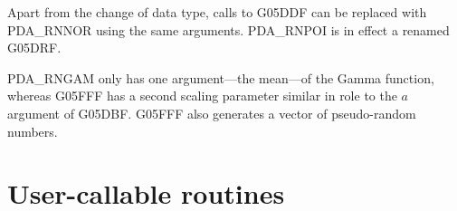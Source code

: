 Apart from the change of data type, calls to G05DDF can be replaced
with PDA\_RNNOR using the same arguments.  PDA\_RNPOI is in effect a
renamed G05DRF.

PDA\_RNGAM only has one argument---the mean---of the Gamma function,
whereas G05FFF has a second scaling parameter similar in role to
the $a$ argument of G05DBF.  G05FFF also generates a vector of
pseudo-random numbers.



\appendix\newpage\small


\section{User-callable routines}










